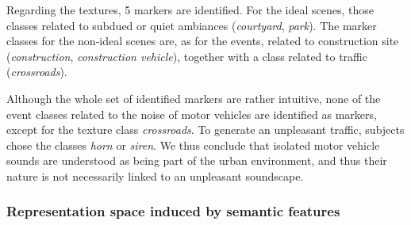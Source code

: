\documentclass[12pt]{elsarticle}
\begin{document}
Regarding the textures, 5 markers are identified. For the ideal scenes, those classes related to subdued or quiet ambiances (\emph{courtyard}, \emph{park}). The marker classes for the non-ideal scenes are, as for the events, related to construction site (\emph{construction}, \emph{construction vehicle}), together with a class related to traffic (\emph{crossroads}).


Although the whole set of identified markers are rather intuitive, none of the event classes related to the noise of motor vehicles are identified as markers, except for the texture class \emph{crossroads}. To generate an unpleasant traffic, subjects chose the classes \emph{horn} or \emph{siren}. We thus conclude that isolated motor vehicle sounds are understood as being part of the urban environment, and thus their nature is not necessarily linked to an unpleasant soundscape.

\subsubsection*{Representation space induced by semantic features}
\end{document}
